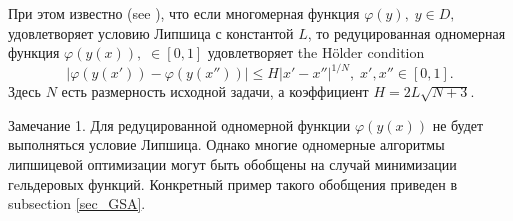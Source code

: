 \documentclass[preprint,12pt]{elsarticle}
\begin{document}
При этом известно (see \cite{Strongin2000}), что если многомерная функция $\varphi(y), \; y \in D,$  удовлетворяет условию Липшица с константой $L$, то редуцированная одномерная функция $\varphi(y(x)), \; \in [0,1]$ удовлетворяет the H{\"o}lder condition
\[
\left|\varphi(y(x'))-\varphi(y(x''))\right|\leq H\left|x'-x''\right|^{1/N}, \; x',x''\in[0,1].
\]
Здесь $N$ есть размерность исходной задачи, а коэффициент $ H=2 L \sqrt{N+3}$.

Замечание 1. Для редуцированной одномерной функции $\varphi(y(x))$  не будет выполняться условие Липшица. Однако многие одномерные алгоритмы липшицевой оптимизации
могут быть обобщены на случай минимизации гeльдеровых функций. Конкретный пример такого обобщения приведен в subsection \ref{sec_GSA}. 

\begin{figure}
\center
\begin{minipage}{0.45\linewidth}
\end{minipage}
\begin{minipage}{0.45\linewidth}

\end{minipage}
\end{figure}
\end{document}
